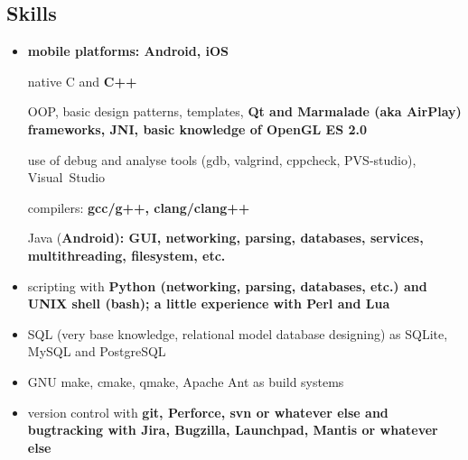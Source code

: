 \begin{flushright}

\fontsize{12pt}{13pt}\selectfont
\section{Skills}
\begin{itemize}

\item \bfseries mobile platforms: \mdseries Android, iOS

\subitem native C and \bfseries C++\mdseries

\subsubitem OOP, basic design patterns, templates,
\bfseries Qt \mdseries and
\bfseries Marmalade \mdseries (aka \bfseries AirPlay\mdseries) frameworks,
\bfseries JNI\mdseries,
basic knowledge of OpenGL ES 2.0

\subsubitem use of debug and analyse tools (gdb, valgrind, cppcheck, PVS-studio),
Visual~Studio

\subsubitem compilers: \bfseries gcc/g++\mdseries, clang/clang++

\subitem Java (\bfseries Android\mdseries): GUI, networking, parsing, databases, services, multithreading, filesystem, etc.

\item scripting with
\bfseries Python \mdseries (networking, parsing, databases, etc.)
and
\bfseries UNIX shell (bash)\mdseries;
a little experience with
\bfseries Perl \mdseries and \bfseries Lua\mdseries

\item SQL (very base knowledge, relational model database designing)
as SQLite, MySQL and PostgreSQL

\item GNU make, cmake, qmake, Apache Ant as build systems

\item version control with \bfseries git\mdseries, Perforce, svn or whatever else
and bugtracking with Jira, Bugzilla, Launchpad, Mantis or whatever else

\end{itemize}


\end{flushright}
